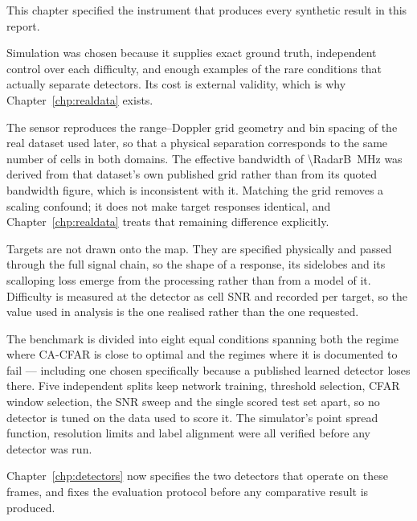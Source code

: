 This chapter specified the instrument that produces every synthetic result in this report.

Simulation was chosen because it supplies exact ground truth, independent control over each
difficulty, and enough examples of the rare conditions that actually separate detectors. Its cost
is external validity, which is why Chapter~\ref{chp:realdata} exists.

The sensor reproduces the range--Doppler grid geometry and bin spacing of the real dataset used
later, so that a physical separation corresponds to the same number of cells in both domains. The
effective bandwidth of \SI{\RadarB}{\mega\hertz} was derived from that dataset's own published grid
rather than from its quoted bandwidth figure, which is inconsistent with it. Matching the grid
removes a scaling confound; it does not make target responses identical, and
Chapter~\ref{chp:realdata} treats that remaining difference explicitly.

Targets are not drawn onto the map. They are specified physically and passed through the full
signal chain, so the shape of a response, its sidelobes and its scalloping loss emerge from the
processing rather than from a model of it. Difficulty is measured at the detector as cell SNR and
recorded per target, so the value used in analysis is the one realised rather than the one
requested.

The benchmark is divided into eight equal conditions spanning both the regime where CA-CFAR is
close to optimal and the regimes where it is documented to fail --- including one chosen
specifically because a published learned detector loses there. Five independent splits keep network
training, threshold selection, CFAR window selection, the SNR sweep and the single scored test set
apart, so no detector is tuned on the data used to score it. The simulator's point spread function,
resolution limits and label alignment were all verified before any detector was run.

Chapter~\ref{chp:detectors} now specifies the two detectors that operate on these frames, and fixes
the evaluation protocol before any comparative result is produced.
